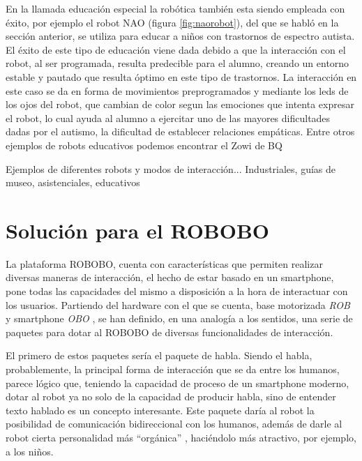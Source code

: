 En la llamada educación especial la robótica también esta siendo empleada con éxito, por ejemplo el robot NAO (figura \ref{fig:naorobot}), del que se habló en la sección anterior, se utiliza para educar a niños con trastornos de espectro autista. El éxito de este tipo de educación viene dada debido a que la interacción con el robot, al ser programada, resulta predecible para el alumno, creando un entorno estable y pautado que resulta óptimo en este tipo de trastornos. La interacción en este caso se da en forma de movimientos preprogramados y mediante los leds de los ojos del robot, que cambian de color segun las emociones que intenta expresar el robot, lo cual ayuda al alumno a ejercitar uno de las mayores dificultades dadas por el autismo, la dificultad de establecer relaciones empáticas.
 Entre otros ejemplos de robots educativos podemos encontrar el Zowi de BQ
 
  Ejemplos de diferentes robots y modos de interacción... Industriales, guías de museo, asistenciales, educativos
 
 
 \section{Solución para el ROBOBO}
 \label{sec:hri-solucion-robobo}
 
 La plataforma ROBOBO, cuenta con características que permiten realizar diversas maneras de interacción, el hecho de estar basado en un smartphone, pone todas las capacidades del mismo a disposición a la hora de interactuar con los usuarios. Partiendo del hardware con el que se cuenta, base motorizada \textit{ROB} y smartphone \textit{OBO} , se han definido, en una analogía a los sentidos, una serie de paquetes para dotar al ROBOBO de diversas funcionalidades de interacción.
 
 El primero de estos paquetes sería el paquete de habla. Siendo el habla, probablemente, la principal forma de interacción que se da entre los humanos, parece lógico que, teniendo la capacidad de proceso de un smartphone moderno, dotar al robot ya no solo de la capacidad de producir habla, sino de entender texto hablado es un concepto interesante. Este paquete daría al robot la posibilidad de comunicación bidireccional con los humanos, además de darle al robot cierta personalidad más \enquote{orgánica} , haciéndolo más atractivo, por ejemplo, a los niños.
 
